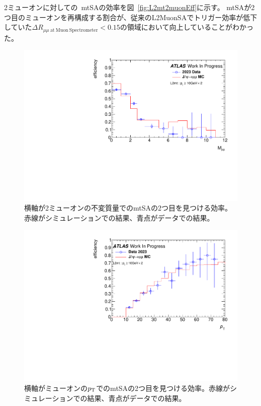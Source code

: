 2ミューオンに対しての~mtSAの効率を図~\ref{fig:L2mt2muonEff}に示す。
mtSAが2つ目のミューオンを再構成する割合が、従来のL2MuonSAでトリガー効率が低下していた$\Delta R_{\mu\mu~\mathrm{at~Muon~Spectrometer}}<0.15$の領域において向上していることがわかった。

\begin{figure}[h]
    \centering
    \includegraphics[clip, width=12cm]{fig/4/L2mt_eff_mass.pdf}
    \caption{横軸が2ミューオンの不変質量でのmtSAの2つ目を見つける効率。赤線がシミュレーションでの結果、青点がデータでの結果。}
    \label{fig:L2mtMassEff}
\end{figure}

\begin{figure}[h]
    \centering
    \includegraphics[clip, width=12cm]{fig/4/L2mt_eff_pt_Jpsi.pdf}
    \caption{横軸がミューオンの$p_\mathrm{T}$でのmtSAの2つ目を見つける効率。赤線がシミュレーションでの結果、青点がデータでの結果。}
    \label{fig:L2mtPtEff}
\end{figure}

